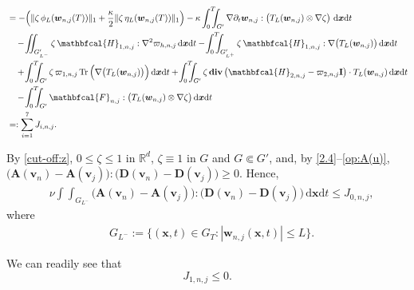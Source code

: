 \documentclass[12pt,reqno]{amsart}
\numberwithin{equation}{section}
\newcommand{\Tr}{\mathop{\mathrm{Tr}}}
\let\originalleft\left
\let\originalright\right
\renewcommand{\left}{\mathopen{}\mathclose\bgroup\originalleft}
\renewcommand{\right}{\aftergroup\egroup\originalright}
\theoremstyle{definition}
\def\dxt{\,\mathrm{d}\boldsymbol{x}\mathrm{d}t}
\def\divv{\mathbf{div}\,}
\def\vv{\boldsymbol{v}}
\def\w{\boldsymbol{w}}
\def\x{\boldsymbol{x}}
\def\bfI{\mathbf{I}}
\def\bfD{\mathbf{D}}
\def\bfA{\mathbf{A}}
\def\bcH{\mathbfcal{H}}
\def\bcF{\mathbfcal{F}}
\def\Tr{\operatorname{Tr}}
\begin{document}
{{{\begin{align}
&=\nonumber
-\left(\|\zeta\,\phi_L(\w_{n,j}(T))\|_1 + \frac{\kappa}{2}\|\zeta\,\eta_L(\w_{n,j}(T))\|_1\right)
-\kappa\int_{0}^{T}\!\!\!\!\int_{G'}\nabla\partial_t\w_{n,j}:\big(T_L(\w_{n,j})\otimes\nabla\zeta\big)\,\dxt \\
&\quad \nonumber
-
\!\int\!\!\!\!\int_{G'_{L^-}}\zeta\,\bcH_{1,n,j}: \nabla^2 \varpi_{h,n,j}\dxt
-\!\int_{0}^{T}\!\!\!\!\int_{G'_{L^+}}\zeta\,\bcH_{1,n,j}:\nabla\big(T_L(\w_{n,j})\big)\dxt \\
&\quad \nonumber +\!\int_{0}^{T}\!\!\!\!\int_{G'}\zeta\,\varpi_{1,n,j}\Tr\Big(\nabla\big(T_L(\w_{n,j})\big)\Big)\dxt
+
\!\int_{0}^{T}\!\!\!\!\int_{G'}\zeta\,\divv\big(\bcH_{2,n,j}-\varpi_{2,n,j}\bfI\big)\cdot T_L(\w_{n,j})\dxt \\
&\quad \nonumber
-
\!\int_{0}^{T}\!\!\!\!\int_{G'}\bcF_{n,j}:\big(T_L(\w_{n,j})\otimes\nabla\zeta\big)\dxt
\\&
=: \sum_{i=1}^7	J_{i,n,j}.
\end{align}

By \eqref{cut-off:z}, $0 \leq \zeta \leq 1$ in $\mathbb{R}^d$, $\zeta\equiv 1$ in $G$ and $G\Subset G'$, and, by \eqref{2.4}--\eqref{op:A(u)},
$\big(\bfA(\vv_n)-\bfA(\vv_j)\big):\big(\bfD(\vv_n)-\bfD(\vv_j)\big)\geq 0$.
Hence,
\begin{equation}\label{est:J0:n:j}
\begin{split}
& \nu\!\int\!\!\!\!\int_{G_{L^-}}\big(\bfA(\vv_n)-\bfA(\vv_j)\big):\big(\bfD(\vv_n)-\bfD(\vv_j)\big)\dxt\leq J_{0,n,j},
\end{split}
\end{equation}
where
\begin{align*}
&  G_{L^-}:=\{(\x,t)\in G_T:|\w_{n,j}(\x,t)|\leq L\}.
\end{align*}

We can readily see that
\begin{equation}\label{est:J1:n:j}
J_{1,n,j}\leq 0.
\end{equation}

}}}
\end{document}
